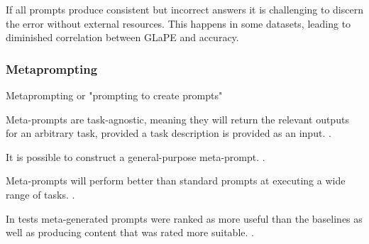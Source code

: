 If all prompts produce consistent but incorrect answers it is challenging to discern the error without external resources. This happens in some datasets, leading to diminished correlation between GLaPE and accuracy. \cite{zhang2024glapegoldlabelagnosticprompt}


\subsubsection{Metaprompting}
Metaprompting or "prompting to create prompts"

Meta-prompts are task-agnostic, meaning they will return the relevant outputs for an arbitrary task, provided a task description is provided as an input.  \cite{dewynter2024metaprompting}.

It is possible to construct a general-purpose meta-prompt. \cite{dewynter2024metaprompting}.

Meta-prompts will perform better than standard prompts at executing a wide range of tasks.  \cite{dewynter2024metaprompting}.

In tests meta-generated prompts were ranked as more useful than the baselines as well as producing content that was rated more suitable.  \cite{dewynter2024metaprompting}.
